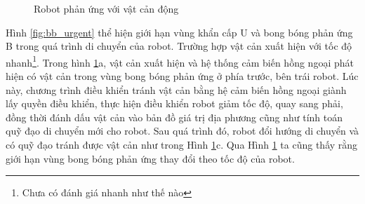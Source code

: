 \begin{figure}[htbp]
    \centering
    \hspace{8pt}
    \hspace{8pt}
    \caption{Robot phản ứng với vật cản động}
    \label{fig:ir-detected-reaction}
\end{figure}

Hình \ref{fig:bb_urgent} thể hiện giới hạn vùng khẩn cấp U và bong bóng phản ứng B trong quá trình di chuyển của robot. Trường hợp vật cản xuất hiện với tốc độ nhanh\footnote{Chưa có đánh giá nhanh như thế nào}. Trong hình \ref{fig:ir-detected-reaction}a, vật cản xuất hiện và hệ thống cảm biến hồng ngoại phát hiện có vật cản trong vùng bong bóng phản ứng ở phía trước, bên trái robot. Lúc này, chương trình điều khiển tránh vật cản bằng hệ cảm biến hồng ngoại giành lấy quyền điều khiển, thực hiện điều khiển robot giảm tốc độ, quay sang phải, đồng thời đánh dấu vật cản vào bản đồ giá trị địa phương cũng như tính toán quỹ đạo di chuyển mới cho robot. Sau quá trình đó, robot đổi hướng di chuyển và có quỹ đạo tránh được vật cản như trong Hình \ref{fig:ir-detected-reaction}c. Qua Hình \ref{fig:ir-detected-reaction} ta cũng thấy rằng giới hạn vùng bong bóng phản ứng thay đổi theo tốc độ của robot.

